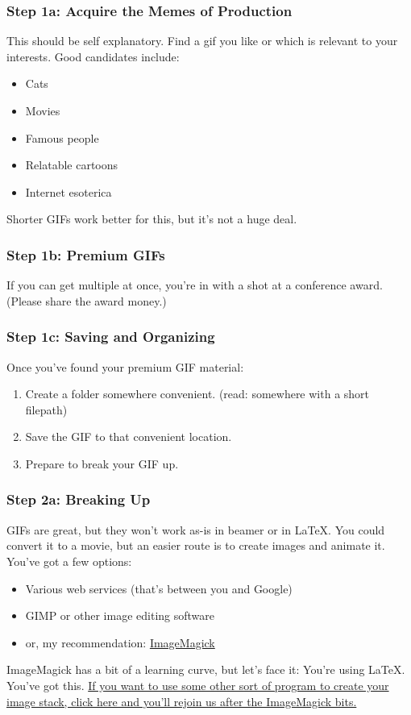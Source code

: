 \documentclass{beamer}
\begin{document}
\begin{frame}
	\frametitle{Step 1a: Acquire the Memes of Production}
	This should be self explanatory. Find a gif you like or which is relevant to your interests. Good candidates include:
		\begin{itemize}
			\item Cats
			\item Movies
			\item Famous people
			\item Relatable cartoons
			\item Internet esoterica
		\end{itemize}
	Shorter GIFs work better for this, but it's not a huge deal.
\end{frame}

\begin{frame}
	\frametitle{Step 1b: Premium GIFs}
	If you can get multiple at once, you're in with a shot at a conference award. (Please share the award money.)
	\begin{center}
	\end{center}
	\end{frame}

\begin{frame}
	\frametitle{Step 1c: Saving and Organizing}
	Once you've found your premium GIF material:
		\begin{enumerate}
			\item Create a folder somewhere convenient. (read: somewhere with a short filepath)
			\item Save the GIF to that convenient location.
			\item Prepare to break your GIF up.
		\end{enumerate}
\end{frame}

\begin{frame}
	\frametitle{Step 2a: Breaking Up}
	GIFs are great, but they won't work as-is in beamer or in \LaTeX. You could convert it to a movie, but an easier route  is to create images and animate it. You've got a few options:
		\begin{itemize}
			\item Various web services (that's between you and Google)
			\item GIMP or other image editing software
			\item or, my recommendation: \href{https://www.imagemagick.org/script/binary-releases.php}{ImageMagick}
		\end{itemize}
	ImageMagick has a bit of a learning curve, but let's face it: You're using \LaTeX. You've got this. \hyperlink{STEP3a}{If you want to use some other sort of program to create your image stack, click here and you'll rejoin us after the ImageMagick bits.}
\end{frame}
\end{document}
